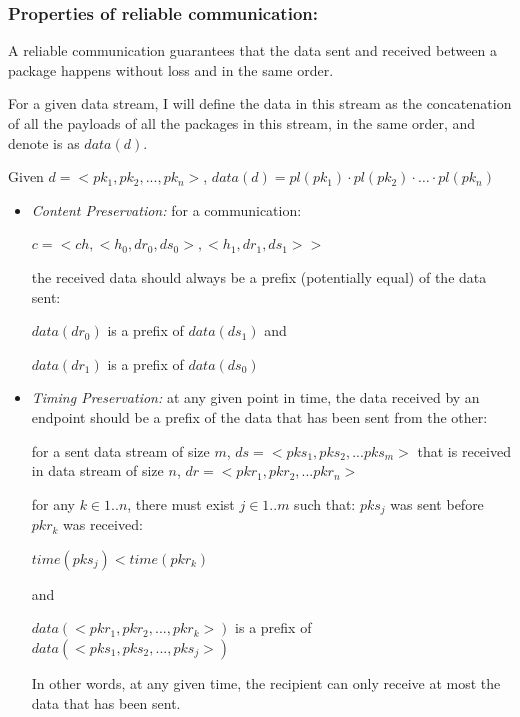 \subsubsection{Properties of reliable communication:}
A reliable communication guarantees that the data sent and received between a package happens without loss and in the same order.

For a given data stream, I will define the data in this stream as the concatenation of all the payloads of all the packages in this stream, in the same order, and denote is as $data(d)$.

Given $ d = <pk_1, pk_2, ..., pk_n>$, $data(d) = pl(pk_1) \cdot pl(pk_2)\cdot \ldots \cdot pl(pk_n)$


\begin{itemize}
 \item \textit{ Content Preservation:} for a communication:

$c = <ch, <h_0, dr_0, ds_0>, <h_1, dr_1, ds_1>>$

the received data should always be a prefix (potentially equal) of the data sent:

$data(dr_0)$ is a prefix of $data(ds_1)$  and

$data(dr_1)$ is a prefix of $data(ds_0)$

 \item \textit{Timing Preservation:} at any given point in time, the data received by an endpoint should be a prefix of the data that has been sent from the other:
 
for a sent data stream of size $m$, $ds= <pks_1, pks_2, ... pks_m>$ that is received in data stream of size $n$, $dr = <pkr_1, pkr_2, ... pkr_n>$

for any $k \in {1..n}$, there must exist $j \in {1..m}$ such that: $pks_j$ was sent before $pkr_k$ was received:

$  time(pks_j) < time(pkr_k)$

  and

$  data(<pkr_1, pkr_2, ..., pkr_k>)$ is a prefix of $data(<pks_1, pks_2, ..., pks_j>)$

  In other words, at any given time, the recipient can only receive at most the data that has been sent.

\end{itemize}


